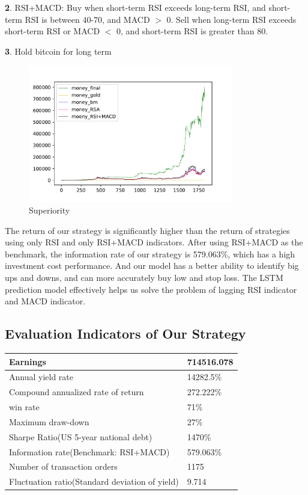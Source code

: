 \documentclass[12pt]{article}
\begin{document}
    \noindent\textbf{2}. RSI+MACD: Buy when short-term RSI exceeds long-term RSI, and short-term RSI is between 40-70, and MACD $>$ 0. Sell when long-term RSI exceeds short-term RSI or MACD $<$ 0, and short-term RSI is greater than 80.
    
    \noindent\textbf{3}. Hold bitcoin for long term
    
    \begin{figure}[H]
        \centering
        \includegraphics[width=0.8\textwidth]{superiority.pdf}
        \caption{Superiority}
        \label{fig:superiority}
    \end{figure}
    
    The return of our strategy is significantly higher than the return of strategies using only RSI and only RSI+MACD indicators. After using RSI+MACD as the benchmark, the information rate of our strategy is 579.063\%, which has a high investment cost performance. And our model has a better ability to identify big ups and downs, and can more accurately buy low and stop loss. The LSTM prediction model effectively helps us solve the problem of lagging RSI indicator and MACD indicator.
    
    \subsection{Evaluation Indicators of Our Strategy}
    \begin{table}[H]
    \centering
    \begin{tabular}{|l|l|}
    \hline
        Earnings & 714516.078  \\ \hline
        Annual yield rate & 14282.5\%  \\ \hline
        Compound annualized rate of return & 272.222\%  \\ \hline
        win rate & 71\%  \\ \hline
        Maximum draw-down & 27\%  \\ \hline
        Sharpe Ratio(US 5-year national debt) & 1470\%  \\ \hline
        Information rate(Benchmark: RSI+MACD) & 579.063\%  \\ \hline
        Number of transaction orders & 1175  \\ \hline
        Fluctuation ratio(Standard deviation of yield) & 9.714  \\ \hline
    \end{tabular}
\end{table}
\end{document}
